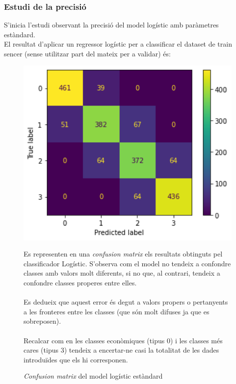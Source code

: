 \documentclass[a4paper, 11pt]{article}
\begin{document}
\subsubsection{Estudi de la precisió}
S'inicia l'estudi observant la precisió del model logístic amb paràmetres estàndard.\\
El resultat d'aplicar un regressor logístic per a classificar el dataset de train sencer (sense utilitzar part del mateix per a validar) és:
\begin{figure}[h] %
\begin{minipage}{7cm} %
\begin{center}
    \includegraphics[width=1\textwidth]{ConfMatrix/confusionmatrix_logistic.png}
    \caption{\textit{Confusion matrix} del model logístic estàndard}
\end{center}
\end{minipage} %
\hspace{2em}
\begin{minipage}{7cm} %
Es representen en una \textit{confusion matrix} els resultats obtinguts pel classificador Logístic. S'observa com el model no tendeix a confondre classes amb valors molt diferents, si no que, al contrari, tendeix a confondre classes properes entre elles.\\\\
Es dedueix que aquest error és degut a valors propers o pertanyents a les fronteres entre les classes (que són molt difuses ja que es sobreposen).\\\\
Recalcar com en les classes econòmiques (tipus 0) i les classes més cares (tipus 3) tendeix a encertar-ne casi la totalitat de les dades introduïdes que els hi corresponen.
\end{minipage} %
\end{figure} %
\end{document}
